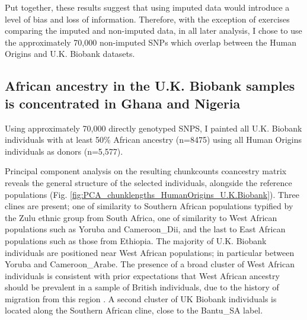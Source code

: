 Put together, these results suggest that using imputed data would introduce a level of bias and loss of information. Therefore, with the exception of exercises comparing the imputed and non-imputed data, in all later analysis, I chose to use the approximately 70,000 non-imputed SNPs which overlap between the Human Origins and U.K. Biobank datasets. 

\subsection{African ancestry in the U.K. Biobank samples is concentrated in Ghana and Nigeria}

Using approximately 70,000 directly genotyped SNPS, I painted all U.K. Biobank individuals with at least 50\% African ancestry (n=8475) using all Human Origins individuals as donors (n=5,577).

Principal component analysis on the resulting chunkcounts coancestry matrix reveals the general structure of the selected individuals, alongside the reference populations (Fig. \ref{fig:PCA_chunklengths_HumanOrigins_U.K.Biobank}). Three clines are present; one of similarity to Southern African populations typified by the Zulu ethnic group from South Africa, one of similarity to West African populations such as Yoruba and Cameroon\_Dii, and the last to East African populations such as those from Ethiopia. The majority of U.K. Biobank individuals are positioned near West African populations; in particular between Yoruba and Cameroon\_Arabe. The presence of a broad cluster of West African individuals is consistent with prior expectations that West African ancestry should be prevalent in a sample of British individuals, due to the history of migration from this region \cite{banton1953recent}. A second cluster of UK Biobank individuals is located along the Southern African cline, close to the Bantu\_SA label. 

